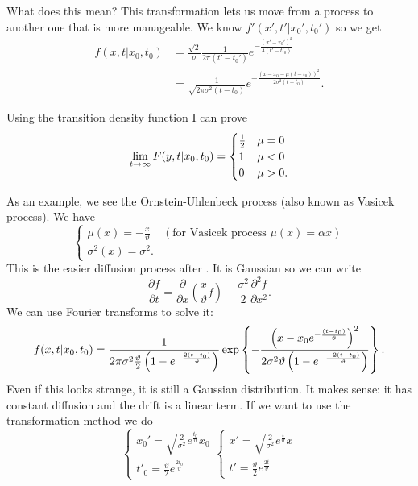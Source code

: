 \documentclass[12pt]{report}
\begin{document}
What does this mean? This transformation lets us move from a process to another one that is more manageable. We know $f'(x',t'|x_{0}',t_{0}')$ so we get
\begin{align*}
	f(x,t|x_{0},t_{0})&=\frac{\sqrt{2}}{\sigma}\frac{1}{2\pi(t'-t_{0}')}e^{-\frac{(x'-x_{0}')^{2}}{4(t'-t'_{0})}}\\
	&=\frac{1}{\sqrt{2\pi\sigma^{2}(t-t_{0})}}e^{-\frac{(x-x_{0}-\mu(t-t_{0}))^{2}}{2\sigma^{2}(t-t_{0})}}.
\end{align*}
\begin{remark}
	Using the transition density function I can prove
	\begin{equation*}
		\lim_{t\to\infty} F(y,t|x_{0},t_{0})=\begin{cases}
			\frac{1}{2}&\mu=0\\
			1&\mu<0\\
			0&\mu>0.
		\end{cases}
	\end{equation*}
\end{remark}
As an example, we see the Ornstein-Uhlenbeck process (also known as Vasicek process). We have
\begin{equation*}
	\begin{cases}
		\mu(x)=-\frac{x}{\vartheta}&(\text{for Vasicek process }\mu(x)=\alpha x)\\
		\sigma^{2}(x)=\sigma^{2}.	\end{cases}
\end{equation*}
This is the easier diffusion process after \bwm. It is Gaussian so we can write
\begin{equation*}
	\frac{\partial f}{\partial t}=\frac{\partial}{\partial x}\left(\frac{x}{\vartheta}f\right)+\frac{\sigma^{2}}{2}\frac{\partial^{2}f}{\partial x^{2}}.
\end{equation*}
We can use Fourier transforms to solve it:
\begin{equation*}
	f(x,t|x_{0},t_{0})=\frac{1}{2\pi\sigma^{2}\frac{\vartheta}{2}\left(1-e^{-\frac{2(t-t_{0})}{\vartheta}}\right)}\exp\left\{-\frac{\left(x-x_{0}e^{-\frac{(t-t_{0})}{\vartheta}}\right)^{2}}{2\sigma^{2}\vartheta\left(1-e^{-\frac{-2(t-t_{0})}{\vartheta}}\right)}\right\}.
\end{equation*}
Even if this looks strange, it is still a Gaussian distribution. It makes sense: it has constant diffusion and the drift is a linear term. If we want to use the transformation method we do
\begin{equation*}
	\begin{cases}
		x_{0}'=\sqrt{\frac{2}{\sigma^{2}}}e^{\frac{t_{0}}{\vartheta}}x_{0}\\
		t'_{0}=\frac{\vartheta}{2}e^{\frac{2t_{0}}{\vartheta}}
	\end{cases}
		\begin{cases}
		x'=\sqrt{\frac{2}{\sigma^{2}}}e^{\frac{t}{\vartheta}}x\\
		t'=\frac{\vartheta}{2}e^{\frac{2t}{\vartheta}}
	\end{cases}
\end{equation*}
\end{document}
